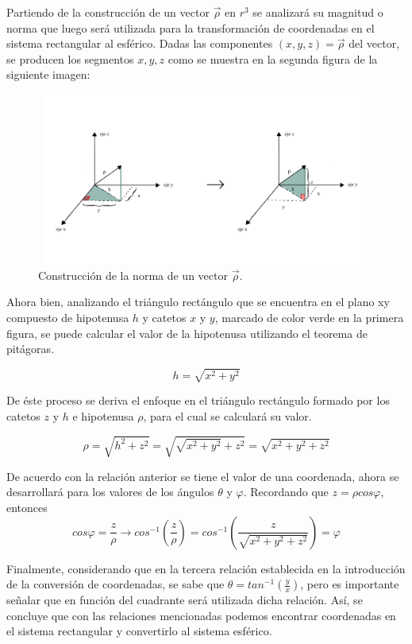 Partiendo de la construcción de un vector ${\vec{\rho}}$ en ${r^{3}}$ se analizará su magnitud o norma que luego será utilizada para la transformación de coordenadas en el sistema rectangular al esférico. Dadas las componentes ${ \left( x,y,z \right )} = \vec{\rho}$ del vector, se producen los segmentos ${x,y,z}$ como se muestra en la segunda figura de la siguiente imagen:

\begin{figure}[H]
  \centering
  \includegraphics[width=11.17cm, height=5.67cm]{img/graph/norma_vectorial.jpg}
  \caption{Construcción de la norma de un vector ${\vec{\rho}}$.}
  \label{relacion_de_coordenadas}
\end{figure}

Ahora bien, analizando el triángulo rectángulo que se encuentra en el plano xy compuesto de hipotenusa ${h}$ y catetos ${x}$ y ${y}$, marcado de color verde en la primera figura, se puede calcular el valor de la hipotenusa utilizando el teorema de pitágoras.

\[ h = \sqrt{x^{2} + y^{2}} \]

\vspace{4mm}
De éste proceso se deriva el enfoque en el triángulo rectángulo formado por los catetos ${z}$ y ${h}$ e hipotenusa ${\rho}$, para el cual se calculará su valor.

\[ \rho = \sqrt{h^{2} + z^{2}} = \sqrt{\sqrt{x^{2} + y^{2}} + z^{2}} = \sqrt{x^{2} + y^{2} + z^{2} } \]

De acuerdo con la relación anterior se tiene el valor de una coordenada, ahora se desarrollará para los valores de los ángulos ${\theta}$ y ${\varphi}$. Recordando que ${z = \rho cos \varphi }$, entonces
\[cos\varphi = \frac{z}{\rho} \rightarrow cos^{-1} \left(\frac{z}{\rho}\right) = cos^{-1} \left(\frac{z}{\sqrt{x^{2} + y^{2} + z^{2} }}\right) = \varphi \]

Finalmente, considerando que en la tercera relación establecida en la introducción de la conversión de coordenadas, se sabe que ${\theta = tan^{-1}\left(\frac{y}{x}\right)}$, pero es importante señalar que en función del cuadrante será utilizada dicha relación. Así, se concluye que con las relaciones mencionadas podemos encontrar coordenadas en el sistema rectangular y convertirlo al sistema esférico.
